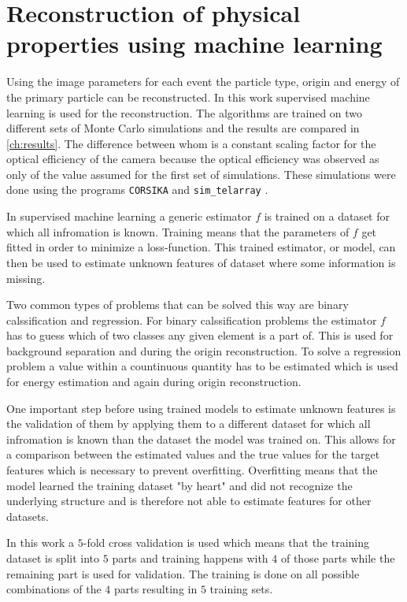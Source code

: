 \chapter{Reconstruction of physical properties using machine learning}
\label{ch:ml}
Using the image parameters for each event the particle type, origin and energy of the primary particle can be reconstructed.
In this work supervised machine learning is used for the reconstruction.
The algorithms are trained on two different sets of Monte Carlo simulations and the results are compared in \autoref{ch:results}.
The difference between whom is a constant scaling factor for the optical efficiency of the camera because 
the optical efficiency was observed as only  of the value assumed for the first set of simulations. 
These simulations were done using the programs \texttt{CORSIKA} and \texttt{sim\_telarray} \cite{simulations}.

In supervised machine learning a generic estimator $f$ is trained on a dataset for which all infromation is known.
Training means that the parameters of $f$ get fitted in order to minimize a loss-function.
This trained estimator, or model, can then be used to estimate unknown features of dataset where some information is missing.

Two common types of problems that can be solved this way are binary calssification and regression. 
For binary calssification problems the estimator $f$ has to guess which of two classes any given element is a part of. 
This is used for background separation and during the origin reconstruction.
To solve a regression problem a value within a countinuous quantity has to be estimated which is used for energy estimation and 
again during origin reconstruction.

One important step before using trained models to estimate unknown features is the validation of them by applying them to a different dataset 
for which all infromation is known than the dataset the model was trained on.
This allows for a comparison between the estimated values and the true values for the target features which is necessary to prevent overfitting.
Overfitting means that the model learned the training dataset "by heart" and did not recognize the underlying structure and is therefore not able
to estimate features for other datasets.

In this work a $\num{5}$-fold cross validation is used which means that the training dataset is split into $\num{5}$ parts and training happens 
with $\num{4}$ of those parts while the remaining part is used for validation. 
The training is done on all possible combinations of the $\num{4}$ parts resulting in $\num{5}$ training sets.

